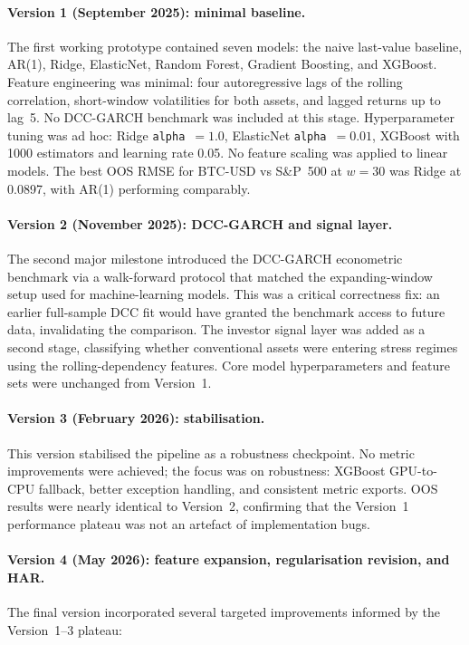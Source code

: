 \paragraph{Version 1 (September 2025): minimal baseline.}
The first working prototype contained seven models: the naive last-value baseline, AR(1), Ridge, ElasticNet,
Random Forest, Gradient Boosting, and XGBoost.
Feature engineering was minimal: four autoregressive lags of the rolling correlation,
short-window volatilities for both assets, and lagged returns up to lag~5.
No DCC-GARCH benchmark was included at this stage.
Hyperparameter tuning was ad hoc: Ridge \texttt{alpha}~$= 1.0$, ElasticNet \texttt{alpha}~$= 0.01$,
XGBoost with 1000 estimators and learning rate 0.05.
No feature scaling was applied to linear models.
The best OOS RMSE for BTC-USD vs S\&P~500 at $w = 30$ was Ridge at 0.0897,
with AR(1) performing comparably.

\paragraph{Version 2 (November 2025): DCC-GARCH and signal layer.}
The second major milestone introduced the DCC-GARCH econometric benchmark via a
walk-forward protocol that matched the expanding-window setup used for machine-learning models.
This was a critical correctness fix: an earlier full-sample DCC fit would have granted the
benchmark access to future data, invalidating the comparison.
The investor signal layer was added as a second stage, classifying whether conventional
assets were entering stress regimes using the rolling-dependency features.
Core model hyperparameters and feature sets were unchanged from Version~1.

\paragraph{Version 3 (February 2026): stabilisation.}
This version stabilised the pipeline as a robustness checkpoint.
No metric improvements were achieved; the focus was on robustness:
XGBoost GPU-to-CPU fallback, better exception handling, and consistent metric exports.
OOS results were nearly identical to Version~2, confirming that the Version~1 performance
plateau was not an artefact of implementation bugs.

\paragraph{Version 4 (May 2026): feature expansion, regularisation revision, and HAR.}
The final version incorporated several targeted improvements informed by the
Version~1--3 plateau:

